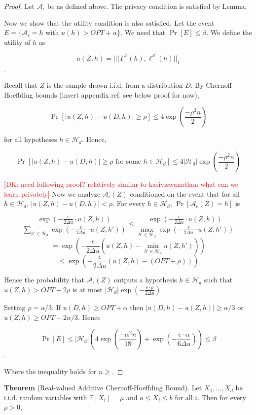 \documentclass[format = sigconf]{acmart}
\newcommand{\dk}[1]{\textcolor{red}{[DK: #1]}}
\newcommand{\A}{\mathcal{A}}
\renewcommand{\H}{\mathcal{H}}
\newcommand{\1}{\mathbbm{1}}
\newcommand{\eps}{\epsilon}
\theoremstyle{definition}
\begin{document}
\begin{proof}
	Let $\A_{\eps}$ be as defined above. The privacy condition is satisfied by Lemma.
	
	Now we show that the utility condition is also satisfied. Let the event $E = \{\A_{\eps} = h \text{ with } u(h) > OPT + \alpha\}$. We need that $\Pr[E] \leq \beta$. We define the utility of $h$ as
	
	$$u(Z,h) = ||(\Gamma^Z(h), \ell^Z(h)||_{1}$$.
	
	Recall that $Z$ is the sample drawn i.i.d. from a distribution $D$. By Chernoff-Hoeffding bounds (insert appendix ref. see below proof for now),
	
	$$\Pr[|u(Z,h) - u(D,h)| \geq \rho] \leq 4\exp(\frac{-\rho^2n}{2})$$
	
	for all hypotheses $h \in \H_d$. Hence,
	
	$$\Pr[|u(Z,h) - u(D,h)| \geq \rho \text{ for some } h \in \H_d] \leq 4|\H_d|\exp(\frac{-\rho^2n}{2})$$
	
	\dk{need following proof? relatively similar to kasiviswanathan what can we learn privately}
	Now we analyze $\A_\eps(Z)$ conditioned on the event that for all $h\in \H_d$, $|u(Z,h) - u(D,h)| < \rho$. For every $h \in \H_d$, $\Pr[\A_\eps(Z) = h]$ is
	
	$$\frac{\exp(-\frac{\eps}{2\Delta u} \cdot u(Z,h))}{\sum_{h'\in\H_d}\exp(-\frac{\eps}{2\Delta u} \cdot u(Z,h'))} \leq \frac{\exp(-\frac{\eps}{2\Delta u} \cdot u(Z,h))}{\max_{h'\in\H_d}\exp(-\frac{\eps}{2\Delta u} \cdot u(Z,h'))} $$
	$$= \exp(-\frac{\eps}{2\Delta u}(u(Z,h) - \min_{h'\in\H_d}u(Z,h')))$$
	$$\leq \exp(-\frac{\eps}{2\Delta u}(u(Z,h) - (OPT + \rho)))$$
	
	Hence the probability that $\A_\eps(Z)$ outputs a hypothesis $h \in \H_d$ such that $u(Z,h) > OPT + 2\rho$ is at most $|\H_d|\exp(-\frac{\eps\cdot\rho}{2\Delta u})$
	
	Setting $\rho = \alpha/3$. If $u(D,h) \geq OPT + \alpha$ then $|u(D,h) - u(Z,h)| \geq \alpha/3$ or $u(Z,h) \geq OPT + 2\alpha/3$. Hence
	
	$$\Pr[E] \leq |\H_d|(4\exp(\frac{-\alpha^2n}{18}) + \exp(-\frac{\eps\cdot\alpha}{6\Delta u})) \leq \beta$$.
	
	Where the inequality holds for $n \geq $. 
\end{proof}
{\bf Theorem} (Real-valued Additive Chernoff-Hoeffding Bound). Let $X_1,...,X_d$ be i.i.d. random variables with $\mathbb{E}[X_i] = \mu$ and $a \leq X_i \leq b$ for all $i$. Then for every $\rho > 0$,
\end{document}
